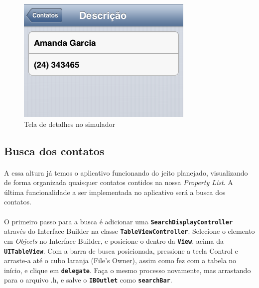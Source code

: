 \documentclass[a4paper,12pt,brazil,doubleside]{book}
\begin{document}
\begin{singlespace}
\begin{figure}[H]
  \centering
  \includegraphics[totalheight=0.3\textheight]{figuras/table/table5.png}
  \caption{Tela de detalhes no simulador}
  \label{fig:a}
\end{figure}

\subsection{Busca dos contatos}

\paragraph{}A essa altura já temos o aplicativo funcionando do jeito planejado, visualizando de forma organizada quaisquer contatos contidos na nossa \emph{Property List}. A última funcionalidade a ser implementada no aplicativo será a busca dos contatos.
\paragraph{}O primeiro passo para a busca é adicionar uma \texttt{\textbf{SearchDisplayController}} através do Interface Builder na classe \texttt{\textbf{TableViewController}}. Selecione o elemento em \emph{Objects} no Interface Builder, e posicione-o dentro da \texttt{\textbf{View}}, acima da \texttt{\textbf{UITableView}}. Com a barra de busca posicionada, pressione a tecla Control e arraste-a até o cubo laranja (File's Owner), assim como fez com a tabela no início, e clique em \texttt{\textbf{delegate}}. Faça o mesmo processo novamente, mas arrastando para o arquivo .h, e salve o \texttt{\textbf{IBOutlet}} como \texttt{\textbf{searchBar}}.

\bigskip
\bigskip


\end{singlespace}
\end{document}
